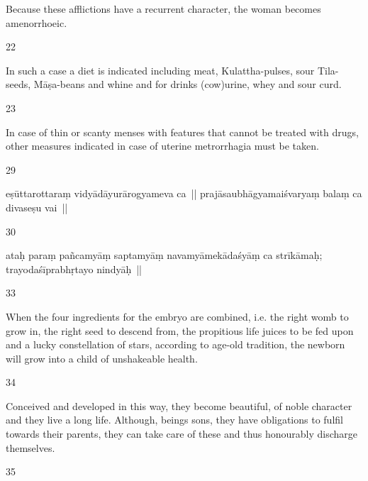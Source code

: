 \begin{translation}
\begin{tt}
Because these afflictions have a recurrent character, the woman 
  becomes amenorrhoeic. 
  
\item[22]

In such a case a diet is indicated including meat, Kulattha-pulses, sour 
  Tila-seeds, Māṣa-beans and whine and for drinks (cow)urine, whey and sour 
  curd.
  
\item[23]

In case of thin or scanty menses with features that cannot be treated 
  with drugs, other measures indicated in case of uterine metrorrhagia must be 
  taken. 
  
\item[29]


  eṣūttarottaraṃ vidyādāyurārogyameva ca || prajāsaubhāgyamaiśvaryaṃ balaṃ 
  ca divaseṣu vai ||
  
\item[30]


  ataḥ paraṃ pañcamyāṃ saptamyāṃ navamyāmekādaśyāṃ ca strīkāmaḥ; 
  trayodaśīprabhṛtayo nindyāḥ ||
  
\item[33]

 When the four ingredients for the embryo are combined, i.e. the right 
  womb to grow in, the right seed to descend from, the propitious life juices to be 
  fed upon and a lucky constellation of stars, according to age-old tradition, the 
  newborn will grow into a child of unshakeable health. 
  
\item[34]

Conceived and developed in this way, they become beautiful, of noble 
  character and they live a long life. Although, beings sons, they have obligations 
  to fulfil towards their parents, they can take care of these and thus honourably 
  discharge themselves.
  
\item[35]


\end{tt}
\end{translation}
